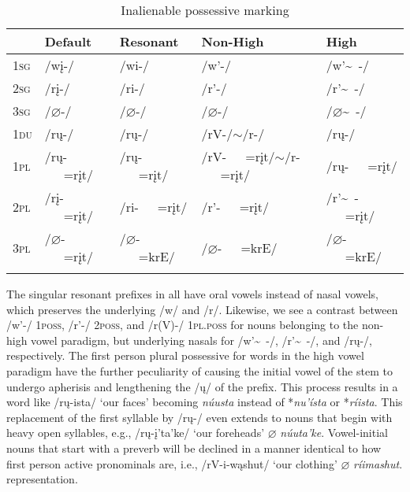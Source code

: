 \begin{table}
        \caption{Inalienable possessive marking}\label{TableInalienablePrefixes}
    \begin{tabular}{lllll}
\lsptoprule
    ~&  \textbf{Default}&\textbf{Resonant}&\textbf{Non-High}&\textbf{High}\\
\midrule
    \textsc{1sg} &/wį-/&     /wi-/&      /w'-/&  /w'\~~-/\\
    \textsc{2sg} &/rį-/&     /ri-/&      /r'-/&  /r'\~~-/\\
    \textsc{3sg} &/$\varnothing$-/&     /$\varnothing$-/&      /$\varnothing$-/&  /$\varnothing$\~~-/\\
    \textsc{1du} &/rų-/&     /rų-/&      /rV-/$\sim$/r-/&  /rų-/\\
    \textsc{1pl} &/rų-~~~=rįt/&     /rų-~~~=rįt/&      /rV-~~~=rįt/$\sim$/r-~~~=rįt/&  /rų-~~~=rįt/\\
    \textsc{2pl} &/rį-~~~=rįt/&     /ri-~~~=rįt/&      /r'-~~~=rįt/&  /r'\~~-~~~=rįt/\\
    \textsc{3pl} &/$\varnothing$-~~~=rįt/&     /$\varnothing$-~~~=krE/&      /$\varnothing$-~~~=krE/&  /$\varnothing$-~~~=krE/\\\lspbottomrule
    \end{tabular}

\end{table}

The singular resonant prefixes in  all have oral vowels instead of nasal vowels, which preserves the underlying /w/ and /r/. Likewise, we see a contrast between /w'-/ \textsc{1poss},  /r'-/ \textsc{2poss}, and /r(V)-/ \textsc{1pl.poss} for nouns belonging to the non-high vowel paradigm, but underlying nasals for /w'\~~-/, /r'\~~-/, and /rų-/, respectively. The first person plural possessive for words in the high vowel paradigm have the further peculiarity of causing the initial vowel of the stem to undergo apherisis and lengthening the /ų/ of the prefix. This process results in a word like /rų-ista/ `our faces' becoming \textit{núusta} instead of *\textit{nu'ísta} or *\textit{ríista}. This replacement of the first syllable by /rų-/ even extends to nouns that begin with heavy open syllables, e.g., /rų-į'ta'ke/ `our foreheads' $\varnothing$ \textit{núuta'ke}. Vowel-initial nouns that start with a preverb will be declined in a manner identical to how first person active pronominals are, i.e., /rV-i-wąshut/ `our clothing' $\varnothing$ \textit{ríimashut}. representation.


